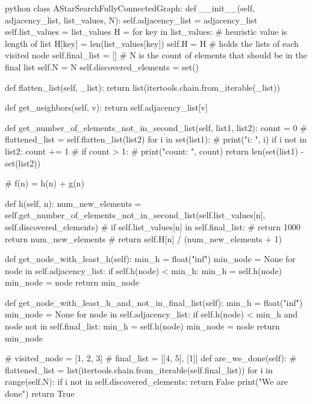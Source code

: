 \begin{mintedbox}{python}
  class AStarSearchFullyConnectedGraph:
    def __init__(self, adjacency_list, list_values, N):
        self.adjacency_list = adjacency_list
        self.list_values = list_values
        H = {}
        for key in list_values:
            # heuristic value is length of list
            H[key] = len(list_values[key])
        self.H = H
        # holds the lists of each visited node
        self.final_list = []
        # N is the count of elements that should be in the final list
        self.N = N
        self.discovered_elements = set()

    def flatten_list(self, _list):
        return list(itertools.chain.from_iterable(_list))

    def get_neighbors(self, v):
        return self.adjacency_list[v]

    def get_number_of_elements_not_in_second_list(self, list1, list2):
        count = 0
        # flattened_list = self.flatten_list(list2)
        for i in set(list1):
            # print("i: ", i)
            if i not in list2:
                count += 1
        # if count > 1:
        #     print("count: ", count)
        return len(set(list1) - set(list2))

    # f(n) = h(n) + g(n)

    def h(self, n):
        num_new_elements = self.get_number_of_elements_not_in_second_list(self.list_values[n], self.discovered_elements)
        # if self.list_values[n] in self.final_list:
        #     return 1000
        return num_new_elements
        # return self.H[n] / (num_new_elements + 1)

    def get_node_with_least_h(self):
        min_h = float("inf")
        min_node = None
        for node in self.adjacency_list:
            if self.h(node) < min_h:
                min_h = self.h(node)
                min_node = node
        return min_node

    def get_node_with_least_h_and_not_in_final_list(self):
        min_h = float("inf")
        min_node = None
        for node in self.adjacency_list:
            if self.h(node) < min_h and node not in self.final_list:
                min_h = self.h(node)
                min_node = node
        return min_node

    # visited_node = [1, 2, 3]
    # final_list = [[4, 5], [1]]
    def are_we_done(self):
        # flattened_list = list(itertools.chain.from_iterable(self.final_list))
        for i in range(self.N):
            if i not in self.discovered_elements:
                return False
        print("We are done")
        return True


\end{mintedbox}
